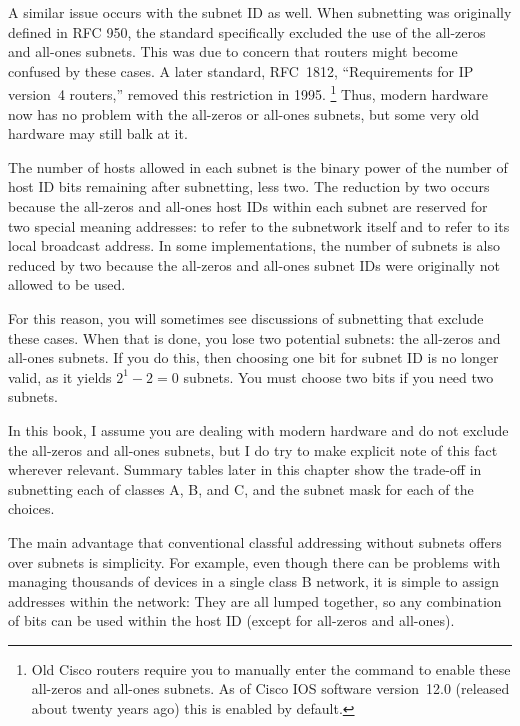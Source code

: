 A similar issue occurs with the subnet ID as well.
When subnetting was originally defined in RFC 950, the standard specifically excluded the use of the all-zeros and all-ones subnets.
This was due to concern that routers might become confused by these cases.
A later standard, RFC~1812, ``Requirements for IP version~4 routers,'' removed this restriction in 1995.%
   \footnote{Old Cisco routers require you to manually enter the  command to enable these all-zeros and all-ones subnets. As of Cisco IOS software version~12.0 (released about twenty years ago) this is enabled by default.}
Thus, modern hardware now has no problem with the all-zeros or all-ones subnets, but some very old hardware may still balk at it.


\begin{keyconcept}
The number of hosts allowed in each subnet is the binary power of the number of host ID bits remaining after subnetting, less two.
The reduction by two occurs because the all-zeros and all-ones
host IDs within each subnet are reserved for two special meaning addresses: to refer to the subnetwork itself and to refer to its local broadcast address.
In some implementations, the number of subnets is also reduced by two because the all-zeros and all-ones subnet IDs were originally not allowed to be used.
\end{keyconcept}

For this reason, you will sometimes see discussions of subnetting that exclude these cases.
When that is done, you lose two potential subnets: the all-zeros and all-ones subnets.
If you do this, then choosing one bit for subnet ID is no longer valid, as it yields $2^{1}-2=0$ subnets.
You must choose two bits if you need two subnets.

\begin{note}
In this book, I assume you are dealing with modern hardware and do not exclude the all-zeros and all-ones subnets,
but I do try to make explicit note of this fact wherever relevant.
Summary tables later in this chapter show the trade-off in subnetting each of classes A, B, and C, and the subnet mask for each of the choices.
\end{note}


The main
advantage that conventional classful addressing without subnets offers
over subnets is simplicity. For example, even though there can be
problems with managing thousands of devices in a single class B network,
it is simple to assign addresses within the network: They are all lumped
together, so any combination of bits can be used within the host ID
(except for all-zeros and all-ones).

